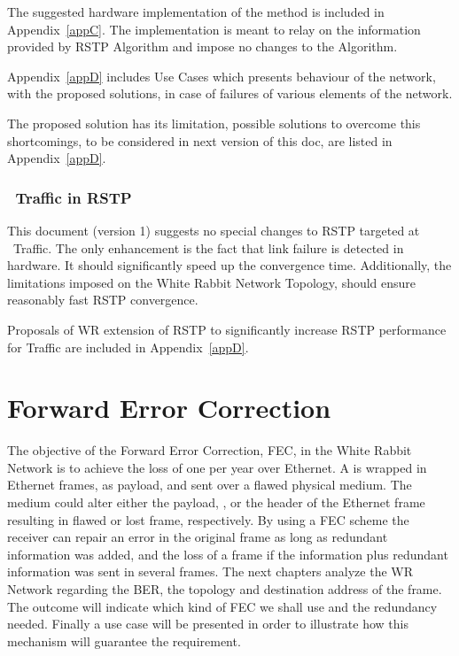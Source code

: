 The suggested hardware implementation of the method is included in
Appendix~\ref{appC}. The implementation is meant to relay on the information
provided by RSTP Algorithm and impose no changes to the Algorithm. 
 
Appendix~\ref{appD} includes Use Cases which presents behaviour of the network,
with the proposed solutions, in case of failures of various elements of the
network.

The proposed solution has its limitation, possible solutions to overcome this
shortcomings, to be considered in next version of this doc, are listed in
Appendix~\ref{appD}.

 
\subsubsection {\StandardPriority\ Traffic in RSTP}  

This document (version 1) suggests no special changes to RSTP targeted at
\StandardPriority\ Traffic. The only enhancement is the fact that link failure
is detected in hardware. It should significantly speed up the convergence time.
Additionally, the limitations imposed on the White Rabbit Network Topology,
should ensure reasonably fast RSTP convergence. 

Proposals of WR extension of RSTP to significantly increase RSTP performance
for \StandardPriority Traffic are included in Appendix~\ref{appD}.


\section{Forward Error Correction}
\label{chapter:FEC}

The objective of the Forward Error Correction, FEC, in the White Rabbit Network
is to achieve the loss of one \ControlMessage per year over Ethernet. A
\ControlMessage is wrapped in Ethernet frames, as payload, and sent over a
flawed physical medium. The medium could alter either the payload,
\ControlMessage, or the header of the Ethernet frame resulting in flawed or lost
frame, respectively. By using a FEC scheme the receiver can repair an error
in the original frame as long as redundant information was added, and the loss
of a frame if the information plus redundant information was sent in several
frames. The next chapters analyze the WR Network regarding the BER, the
topology and destination address of the frame. The outcome will indicate which
kind of FEC we shall use and the redundancy needed. Finally a use case will be
presented in order to illustrate how this mechanism will guarantee the
requirement.

